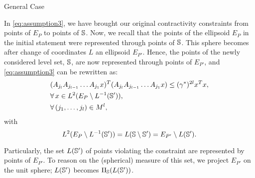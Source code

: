 \begin{subsection}{General Case}
\begin{pf}
In \eqref{eq:assumption3}, we have brought our original contractivity constraints from points of $E_P$ to points of $\mathbb{S}$. Now, we recall that the points of the ellipsoid $E_P$ in the initial statement were represented through points of $\mathbb{S}$. This sphere becomes after change of coordinates $L$ an ellipsoid $E_{P'}$. Hence, the points of the newly considered level set, $\mathbb{S}$, are now represented through points of $E_{P'}$, and \eqref{eq:assumption3} can be rewritten as:
\begin{equation*}\label{eq:assumption4}
\begin{aligned}
& (\relax{A}_{j_l} \relax{A}_{j_{l-1}} \dots \relax{A_{j_1}} x)^T  (\relax{A}_{j_l} \relax{A}_{j_{l-1}} \dots \relax{A}_{j_1} x) \leq ({\gamma^*})^{2l} x^T  x, \\
&  \forall\, x \in  L^2(E_P \setminus L^{-1}(\mathbb{S}')),\\
& \forall\, (j_1,\dots,j_l) \in M^l,
\end{aligned}
\end{equation*}
with $$L^2(E_P \setminus L^{-1}(\mathbb{S}')) = L(\mathbb{S} \setminus \mathbb{S}') = E_{P'} \setminus L(\mathbb{S}').$$
\begin{figure}[H]
\begin{center}
\end{center}
\end{figure}
Particularly, the set $L(\mathbb{S}')$ of points violating the constraint are represented by points of $E_{P'}$. To reason on the (spherical) measure of this set, we project $E_{P'}$ on the unit sphere; $L(\mathbb{S}')$ becomes $\Pi_{\mathbb{S}}(L(\mathbb{S}'))$.


\end{pf}
\end{subsection}
